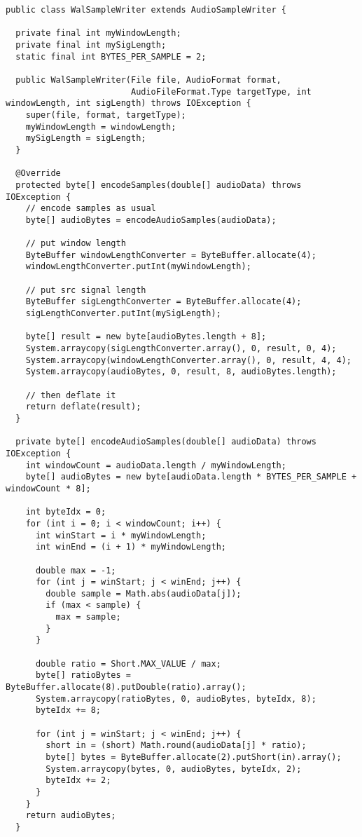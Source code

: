 \begin{lstlisting}[caption={Запись wal файла}]
public class WalSampleWriter extends AudioSampleWriter {

  private final int myWindowLength;
  private final int mySigLength;
  static final int BYTES_PER_SAMPLE = 2;

  public WalSampleWriter(File file, AudioFormat format,
                         AudioFileFormat.Type targetType, int windowLength, int sigLength) throws IOException {
    super(file, format, targetType);
    myWindowLength = windowLength;
    mySigLength = sigLength;
  }

  @Override
  protected byte[] encodeSamples(double[] audioData) throws IOException {
    // encode samples as usual
    byte[] audioBytes = encodeAudioSamples(audioData);

    // put window length
    ByteBuffer windowLengthConverter = ByteBuffer.allocate(4);
    windowLengthConverter.putInt(myWindowLength);

    // put src signal length
    ByteBuffer sigLengthConverter = ByteBuffer.allocate(4);
    sigLengthConverter.putInt(mySigLength);

    byte[] result = new byte[audioBytes.length + 8];
    System.arraycopy(sigLengthConverter.array(), 0, result, 0, 4);
    System.arraycopy(windowLengthConverter.array(), 0, result, 4, 4);
    System.arraycopy(audioBytes, 0, result, 8, audioBytes.length);

    // then deflate it
    return deflate(result);
  }

  private byte[] encodeAudioSamples(double[] audioData) throws IOException {
    int windowCount = audioData.length / myWindowLength;
    byte[] audioBytes = new byte[audioData.length * BYTES_PER_SAMPLE + windowCount * 8];

    int byteIdx = 0;
    for (int i = 0; i < windowCount; i++) {
      int winStart = i * myWindowLength;
      int winEnd = (i + 1) * myWindowLength;

      double max = -1;
      for (int j = winStart; j < winEnd; j++) {
        double sample = Math.abs(audioData[j]);
        if (max < sample) {
          max = sample;
        }
      }

      double ratio = Short.MAX_VALUE / max;
      byte[] ratioBytes = ByteBuffer.allocate(8).putDouble(ratio).array();
      System.arraycopy(ratioBytes, 0, audioBytes, byteIdx, 8);
      byteIdx += 8;

      for (int j = winStart; j < winEnd; j++) {
        short in = (short) Math.round(audioData[j] * ratio);
        byte[] bytes = ByteBuffer.allocate(2).putShort(in).array();
        System.arraycopy(bytes, 0, audioBytes, byteIdx, 2);
        byteIdx += 2;
      }
    }
    return audioBytes;
  }


\end{lstlisting}
